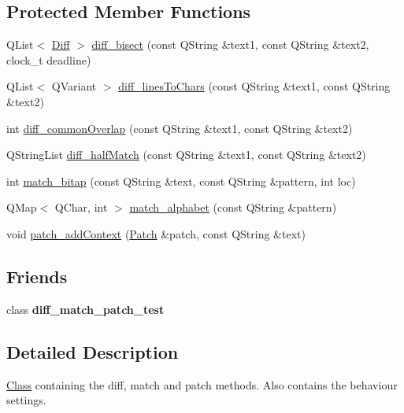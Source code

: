 \subsection*{Protected Member Functions}
\begin{DoxyCompactItemize}
\item 
Q\+List$<$ \hyperlink{class_diff}{Diff} $>$ \hyperlink{classdiff__match__patch_a10f6b81afc589a091a74d00d58ec1a5a}{diff\+\_\+bisect} (const Q\+String \&text1, const Q\+String \&text2, clock\+\_\+t deadline)
\item 
Q\+List$<$ Q\+Variant $>$ \hyperlink{classdiff__match__patch_ab1f120b83d49948767de531ab2a4e15a}{diff\+\_\+lines\+To\+Chars} (const Q\+String \&text1, const Q\+String \&text2)
\item 
int \hyperlink{classdiff__match__patch_aa47c81e235ed1609fb915f03316d21dc}{diff\+\_\+common\+Overlap} (const Q\+String \&text1, const Q\+String \&text2)
\item 
Q\+String\+List \hyperlink{classdiff__match__patch_a34e2eabd2503e28eebe97a05dc3783dc}{diff\+\_\+half\+Match} (const Q\+String \&text1, const Q\+String \&text2)
\item 
int \hyperlink{classdiff__match__patch_a9d8ebaab2f4cd4fb2ab01a3110c56b86}{match\+\_\+bitap} (const Q\+String \&text, const Q\+String \&pattern, int loc)
\item 
Q\+Map$<$ Q\+Char, int $>$ \hyperlink{classdiff__match__patch_a106c32e9978fc36cafe6f1bc8f81bf8d}{match\+\_\+alphabet} (const Q\+String \&pattern)
\item 
void \hyperlink{classdiff__match__patch_a330cc0e446453f69d18a90ba9887c7db}{patch\+\_\+add\+Context} (\hyperlink{class_patch}{Patch} \&patch, const Q\+String \&text)
\end{DoxyCompactItemize}
\subsection*{Friends}
\begin{DoxyCompactItemize}
\item 
\mbox{\label{classdiff__match__patch_ab85b721264b16d0a4d42230097d485ca}} 
class {\bfseries diff\+\_\+match\+\_\+patch\+\_\+test}
\end{DoxyCompactItemize}


\subsection{Detailed Description}
\hyperlink{struct_class}{Class} containing the diff, match and patch methods. Also contains the behaviour settings. 


